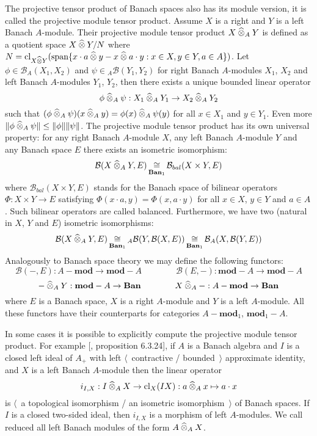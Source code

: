 The projective tensor product of Banach spaces also has its module version, it is
called the projective module tensor product. Assume $X$ is a right and $Y$ is a
left Banach $A$-module. Their projective module tensor product
$X\mathbin{\widehat{\otimes}}_{A}Y$ is defined as a quotient space $X\mathbin{\widehat{\otimes}} Y / N$ where
$N
=\operatorname{cl}_{X\mathbin{\widehat{\otimes}} Y}(\operatorname{span} \{
  x\cdot a\mathbin{\widehat{\otimes}} y-x\mathbin{\widehat{\otimes}} a\cdot y
  :x\in X,y\in Y,a\in A
 \})$. 
Let $\phi\in\mathcal{B}_A(X_1,X_2)$ and $\psi\in{}_A\mathcal{B}(Y_1,Y_2)$ 
for right Banach $A$-modules $X_1$, $X_2$ and left 
Banach $A$-modules $Y_1$, $Y_2$, then there exists a unique bounded 
linear operator 
$$
\phi\mathbin{\widehat{\otimes}}_{A} \psi:X_1\mathbin{\widehat{\otimes}}_{A} Y_1\to X_2\mathbin{\widehat{\otimes}}_{A} Y_2
$$ 
such that
$(\phi\mathbin{\widehat{\otimes}}_{A} \psi)(x\mathbin{\widehat{\otimes}}_{A} y)=\phi(x)\mathbin{\widehat{\otimes}}_{A} \psi(y)$
for all $x\in X_1$ and $y\in Y_1$. Even more 
$\Vert \phi\mathbin{\widehat{\otimes}}_{A} \psi\Vert\leq\Vert \phi\Vert\Vert \psi\Vert$. 
The projective module tensor product has its own universal property: for any
right Banach $A$-module $X$, any left Banach $A$-module $Y$ and any Banach space
$E$ there exists an isometric isomorphism:
$$
\mathcal{B}(X\mathbin{\widehat{\otimes}}_{A}Y,E)
\mathop{\mathbin{\cong}}\limits_{\mathbf{Ban}_1}
\mathcal{B}_{bal}(X\times Y, E)
$$
where $\mathcal{B}_{bal}(X\times Y, E)$ stands for the Banach space of bilinear
operators $\Phi:X\times Y\to E$ satisfying $\Phi(x\cdot a,y)=\Phi(x,a\cdot y)$
for all $x\in X$, $y\in Y$ and $a\in A$. Such bilinear operators are called
balanced. Furthermore, we have two (natural in $X$, $Y$ and $E$) isometric
isomorphisms:
$$
\mathcal{B}(X\mathbin{\widehat{\otimes}}_{A}Y,E)
\mathop{\mathbin{\cong}}\limits_{\mathbf{Ban}_1}
{}_A\mathcal{B}(Y,\mathcal{B}(X,E))
\mathop{\mathbin{\cong}}\limits_{\mathbf{Ban}_1}
\mathcal{B}_A(X,\mathcal{B}(Y,E))
$$
Analogously to Banach space theory we may define the following functors:
$$
\mathcal{B}(-,E):A-\mathbf{mod}\to \mathbf{mod}-A
\qquad\qquad
\mathcal{B}(E,-):\mathbf{mod}-A\to \mathbf{mod}-A
$$
$$
-\mathbin{\widehat{\otimes}}_{A} Y:\mathbf{mod}-A\to\mathbf{Ban}
\qquad\qquad
X\mathbin{\widehat{\otimes}}_{A} -:A-\mathbf{mod}\to\mathbf{Ban}
$$
where $E$ is a Banach space, $X$ is a right $A$-module and $Y$ is a left
$A$-module. All these functors have their counterparts for categories
$A-\mathbf{mod}_1$, $\mathbf{mod}_1-A$. 

In some cases it is possible to explicitly compute the projective module tensor
product. For example [\cite{HelBanLocConvAlg}, proposition 6.3.24], if $A$ is a 
Banach algebra and $I$ is a closed left ideal of $A_+$ with 
left $\langle$~contractive / bounded~$\rangle$ approximate identity, and $X$ is 
a left Banach $A$-module then the linear operator 
$$
i_{I,X}
:I\mathbin{\widehat{\otimes}}_{A}X \to \operatorname{cl}_X(IX)
:a\mathbin{\widehat{\otimes}}_{A} x\mapsto a\cdot x
$$
is $\langle$~a topological isomorphism / an isometric isomorphism~$\rangle$ of
Banach spaces. If $I$ is a closed two-sided ideal, then $i_{I,X}$ is a morphism of left
$A$-modules. We call reduced all left Banach modules of the form
$A\mathbin{\widehat{\otimes}}_{A}X$. 

